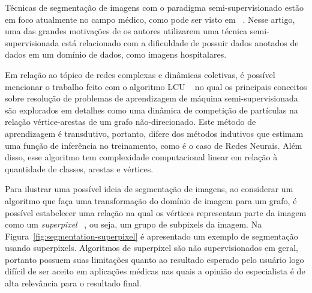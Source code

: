 Técnicas de segmentação de imagens com o paradigma semi-supervisionado
estão em foco atualmente no campo médico, como pode ser visto em
~\cite{LuoSemiSupervised2021}. Nesse artigo, uma das grandes
motivações de os autores utilizarem uma técnica semi-supervisionada
está relacionado com a dificuldade de possuir dados anotados de dados
em um domínio de dados, como imagens hospitalares.

Em relação ao tópico de redes complexas e dinâmicas coletivas, é
possível mencionar o trabalho feito com o algoritmo \gls{LCU}
~\cite{VerriNetworkUnfoldingMap2018} no qual os principais conceitos
sobre resolução de problemas de aprendizagem de máquina
semi-supervisionada são explorados em detalhes como uma dinâmica de
competição de partículas na relação vértice-arestas de um grafo
não-direcionado. Este método de aprendizagem é transdutivo, portanto,
difere dos métodos indutivos que estimam uma função de inferência no
treinamento, como é o caso de Redes Neurais. Além disso, esse
algoritmo tem complexidade computacional linear em relação à
quantidade de classes, arestas e vértices.

Para ilustrar uma possível ideia de segmentação de imagens, ao
considerar um algoritmo que faça uma transformação do domínio de
imagem para um grafo, é possível estabelecer uma relação na qual os
vértices representam parte da imagem como um \textit{superpixel}
~\cite{SuperpixelSurvey2020}, ou seja, um grupo de subpixels da
imagem. Na Figura~\ref{fig:segmentation-superpixel} é apresentado um
exemplo de segmentação usando superpixels. Algoritmos de superpixel
são não supervisionados em geral, portanto possuem suas limitações
quanto ao resultado esperado pelo usuário \textendash\hfill logo
difícil de ser aceito em aplicações médicas nas quais a opinião do
especialista é de alta relevância para o resultado final.

\begin{figure}[!h]
        \captionsetup{width=9cm}
		\centering
\end{figure}



